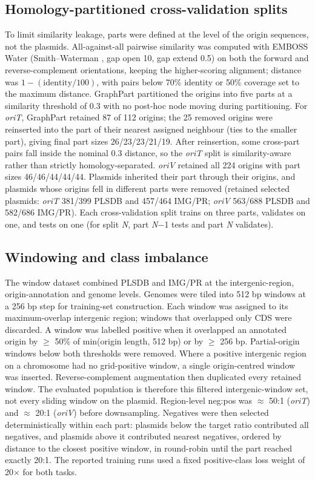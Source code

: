 \subsection*{Homology-partitioned cross-validation splits}

To limit similarity leakage, parts were defined at the level of the origin
sequences, not the plasmids. All-against-all pairwise similarity was computed
with EMBOSS Water \cite{rice2000emboss}
(Smith--Waterman \cite{smith1981identification}, gap open 10, gap extend 0.5) on both the forward and
reverse-complement orientations, keeping the higher-scoring alignment;
distance was $1 - (\text{identity}/100)$, with pairs below 70\% identity or
50\% coverage set to the maximum distance. GraphPart \cite{teufel2023graphpart} partitioned the origins into five parts at a similarity threshold of 0.3 with
no post-hoc node moving during partitioning. For \emph{oriT}, GraphPart
retained 87 of 112 origins; the 25 removed origins were reinserted into the
part of their nearest assigned neighbour (ties to the smaller part), giving
final part sizes 26/23/23/21/19. After reinsertion, some cross-part pairs
fall inside the nominal 0.3 distance, so the \emph{oriT} split is
similarity-aware rather than strictly homology-separated. \emph{oriV}
retained all 224 origins with part sizes 46/46/44/44/44. Plasmids inherited
their part through their origins, and plasmids whose origins fell in
different parts were removed (retained selected plasmids: \emph{oriT} 381/399
PLSDB and 457/464 IMG/PR; \emph{oriV} 563/688 PLSDB and 582/686 IMG/PR). Each
cross-validation split trains on three parts, validates on one, and tests on
one (for split \emph{N}, part \emph{N}$-$1 tests and part \emph{N}
validates).

\subsection*{Windowing and class imbalance}

The window dataset combined PLSDB and IMG/PR at the intergenic-region,
origin-annotation and genome levels. Genomes were tiled into 512 bp windows
at a 256 bp step for training-set construction. Each window was assigned to
its maximum-overlap intergenic region; windows that overlapped only CDS were
discarded. A window was labelled positive when it overlapped an annotated
origin by $\geq$ 50\% of min(origin length, 512 bp) or by $\geq$ 256 bp.
Partial-origin windows below both thresholds were removed. Where a positive
intergenic region on a chromosome had no grid-positive window, a single
origin-centred window was inserted. Reverse-complement augmentation then
duplicated every retained window. The evaluated population is therefore this
filtered intergenic-window set, not every sliding window on the plasmid.
Region-level neg:pos was $\approx$ 50:1 (\emph{oriT}) and $\approx$ 20:1
(\emph{oriV}) before downsampling. Negatives were then selected
deterministically within each part: plasmids below the target ratio
contributed all negatives, and plasmids above it contributed nearest
negatives, ordered by distance to the closest positive window, in round-robin
until the part reached exactly 20:1. The reported training runs used a fixed
positive-class loss weight of 20$\times$ for both tasks.

